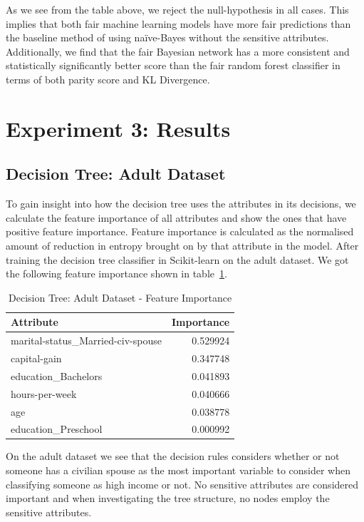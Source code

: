 As we see from the table above, we reject the null-hypothesis in all cases. This implies that both fair machine learning models have more fair predictions than the baseline method of using naïve-Bayes without the sensitive attributes. Additionally, we find that the fair Bayesian network has a more consistent and statistically significantly better score than the fair random forest classifier in terms of both parity score and KL Divergence.

\section{Experiment 3: Results}

\subsection{Decision Tree: Adult Dataset}

To gain insight into how the decision tree uses the attributes in its decisions, we calculate the feature importance of all attributes and show the ones that have positive feature importance. Feature importance is calculated as the normalised amount of reduction in entropy brought on by that attribute in the model. After training the decision tree classifier in Scikit-learn on the adult dataset. We got the following feature importance shown in table~\ref{tab:dectreeadultimp}.

\begin{table}[]
    \centering
    \begin{tabular}{lr}
    \toprule
    Attribute &  Importance \\
    \midrule
    marital-status\_Married-civ-spouse &    0.529924 \\
    capital-gain &    0.347748 \\
    education\_Bachelors &    0.041893 \\
    hours-per-week &    0.040666 \\
    age &    0.038778 \\
    education\_Preschool &    0.000992 \\
    \bottomrule
    \end{tabular}
    \caption{Decision Tree: Adult Dataset - Feature Importance}
    \label{tab:dectreeadultimp}
\end{table}

On the adult dataset we see that the decision rules considers whether or not someone has a civilian spouse as the most important variable to consider when classifying someone as high income or not. No sensitive attributes are considered important and when investigating the tree structure, no nodes employ the sensitive attributes.

